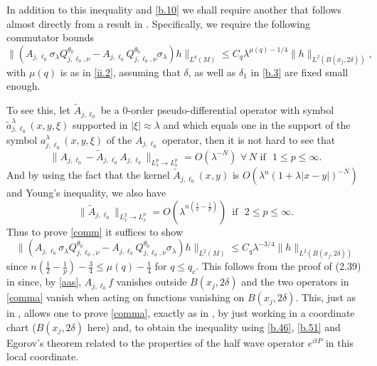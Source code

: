 \documentclass[10pt]{amsart}
\newcommand{\la}{\lambda}
\newcommand{\1}{{\bf 1}}
\begin{document}
In addition to this inequality and \eqref{b.10} we shall require another that follows almost directly from a result
in \cite{HSp}.  Specifically, we require the following commutator bounds
\begin{equation}\label{comm}
\bigl\| (A_{j,\ell_0}\sigma_\la Q^{\theta_0}_{j,\ell_0,\nu}-A_{j,\ell_0}Q^{\theta_0}_{j,\ell_0,\nu}\sigma_\la)h\|_{L^q(M)}
\le C_q \la^{\mu(q)-1/4}\|h\|_{L^2(B(x_j,2\delta))},
\end{equation}
with $\mu(q)$ is as in \eqref{ii.2},
assuming that $\delta$, as well as $\delta_1$ in \eqref{b.3} are fixed small enough. 


To see this, let $\tilde A_{j,\ell_0}$ be a 0-order pseudo-differential operator with symbol $\tilde a_{j,\ell_0}^\la(x,y,\xi)$ supported in $|\xi|\approx \la$ and which equals one in 
the support of the  symbol $ a_{j,\ell_0}^\la(x,y,\xi)$ of the $ A_{j,\ell_0}$ operator, then it is not hard to see that
\begin{equation}\label{i.5a}
\| A_{j,\ell_0}-\tilde A_{j,\ell_0}  A_{j,\ell_0}\|_{L^p_x\to L^p_x}=O(\la^{-N})
\, \, \forall \, N\, \, \text{if } \,
\, 1\le p\le \infty.
\end{equation}
And by using the fact that 
 the kernel $\tilde A_{j,\ell_0} (x,y)$ is $O(\la^{n}(1+\la|x-y|)^{-N})$ and Young's inequality, we also have 
\begin{equation}\label{i.5b}
\| \tilde A_{j,\ell_0} \|_{L^2_x\to L^p_x}=O(\la^{n(\frac12-\frac1p)})\,\,\, \text{if } \,
\, 2\le p\le \infty.
\end{equation}
Thus to prove \eqref{comm} it suffices to show
 \begin{equation}\label{comma}
\bigl\| (A_{j,\ell_0}\sigma_\la Q^{\theta_0}_{j,\ell_0,\nu}-A_{j,\ell_0}Q^{\theta_0}_{j,\ell_0,\nu}\sigma_\la)h\|_{L^2(M)}
\le C_q \la^{-3/4}\|h\|_{L^2(B(x_j,2\delta))}
\end{equation}
since $n(\frac12-\frac1p)-\frac34\le \mu(q)-\frac14$ for $q\le q_c$.
 This follows from the 
proof of (2.39) in \cite{HSp} since, by \eqref{aas}, $A_{j,\ell_0}f$ vanishes outside
$B(x_j,2\delta)$ and the two operators in \eqref{comma} vanish when acting on functions vanishing on
$B(x_j,2\delta)$.  This, just as in \cite{HSp}, allows one to prove \eqref{comma},
exactly as in \cite{HSp},  by just working in a coordinate chart
($B(x_j,2\delta)$ here) and, to obtain the inequality
using \eqref{b.46}, \eqref{b.51} and  Egorov's theorem related to the properties of the half wave operator $e^{itP}$ in this local coordinate.
\end{document}

